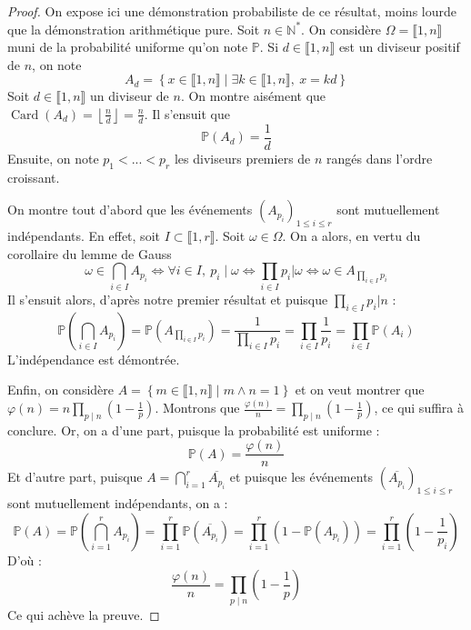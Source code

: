 \documentclass[french]{book}
\newcommand{\N}{\mathbb{N}}
\theoremstyle{plain}
\theoremstyle{definition}
\theoremstyle{remark}
\DeclareMathOperator{\card}{Card}
\begin{document}
\begin{proof}
	On expose ici une démonstration probabiliste de ce résultat, moins lourde que la démonstration arithmétique pure. Soit $n \in\N^*$. On considère $\Omega = \llbracket 1,n \rrbracket$ muni de la probabilité uniforme qu'on note $\mathbb{P}$. Si $d \in \llbracket 1,n \rrbracket$ est un diviseur positif de $n$, on note$$
		A_d = \left\{ x \in \llbracket 1,n \rrbracket \mid \exists k \in \llbracket 1,n \rrbracket, \ x=kd \right\}$$
	Soit $d \in \llbracket 1,n \rrbracket$ un diviseur de $n$. On montre aisément que $\card \left(A_d\right)=\left\lfloor \displaystyle\frac{n}{d} \right\rfloor = \displaystyle\frac{n}{d}$. Il s'ensuit que $$
		\mathbb{P} \left(A_d\right) = \frac{1}{d}$$
	Ensuite, on note $p_1 < ... < p_r$ les diviseurs premiers de $n$ rangés dans l'ordre croissant.\par
	On montre tout d'abord que les événements $\left(A_{p_i}\right)_{1 \le i \le r}$ sont mutuellement indépendants. En effet, soit $I \subset \llbracket 1,r \rrbracket$. Soit $\omega \in \Omega$. On a alors, en vertu du corollaire du lemme de Gauss$$
		\omega \in \bigcap_{i \in I} A_{p_i}
		\iff \forall i \in I, \ p_i \mid \omega
		\iff \prod_{i \in I} p_i \big| \omega
		\iff \omega \in A_{\prod_{i \in I} p_i}$$
	Il s'ensuit alors, d'après notre premier résultat et puisque $\displaystyle\prod_{i \in I} p_i \big| n$ :$$
		\mathbb{P} \left(\bigcap_{i \in I} A_{p_i}\right) = \mathbb{P} \left(A_{\prod_{i \in I} p_i}\right)= \frac{1}{\displaystyle\prod_{i \in I} p_i} = \displaystyle\prod_{i \in I} \frac{1}{p_i} = \displaystyle\prod_{i \in I} \mathbb{P} \left(A_i\right)$$
	L'indépendance est démontrée. \par
	Enfin, on considère $A =\left\{ m \in \llbracket 1,n \rrbracket \mid m \wedge
	n =1 \right\} $ et on veut montrer que $\varphi(n) = n\displaystyle\prod_{p\mid n} \left(1-\frac{1}{p}\right)$.	Montrons que $\displaystyle\frac{\varphi(n)}{n} = \displaystyle\prod_{p\mid n} \left(1-\frac{1}{p}\right)$, ce qui suffira à conclure. Or, on a d'une part, puisque la probabilité est uniforme :$$
		\mathbb{P}(A)=\frac{\varphi(n)}{n}$$
	Et d'autre part, puisque $A = \displaystyle\bigcap_{i=1}^{r} \overline{A_{p_i}} $ et puisque les événements $\left(\overline{A_{p_i}}\right)_{1 \le i \le r}$ sont mutuellement indépendants, on a :$$
		\mathbb{P}(A) =\mathbb{P} \left(\bigcap_{i=1}^r A_{p_i}\right)=\prod_{i=1}^r \mathbb{P} \left( \overline{A_{p_i}}\right) =\prod_{i=1}^r \left( 1-\mathbb{P}\left({A_{p_i}}\right)\right) = \prod_{i=1}^r \left( 1-\frac{1}{p_i}\right)$$
	D'où : $$\frac{\varphi(n)}{n} =\prod_{p \mid n} \left( 1-\frac{1}{p}\right)$$
	Ce qui achève la preuve.
\end{proof}
\end{document}

